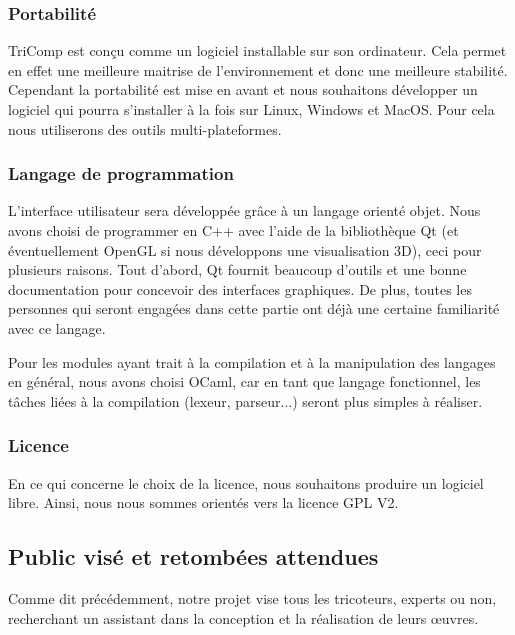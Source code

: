 \documentclass{article}
\begin{document}
\subsubsection{Portabilité}

TriComp est conçu comme un logiciel installable sur son ordinateur. Cela permet en effet une meilleure maitrise de l'environnement et donc 
une meilleure stabilité. Cependant la portabilité est mise en avant et nous souhaitons développer un logiciel qui pourra s'installer à la 
fois sur Linux, Windows et MacOS. Pour cela nous utiliserons des outils multi-plateformes. 

\subsubsection{Langage de programmation}

L'interface utilisateur sera développée grâce à un langage orienté objet. Nous avons choisi de programmer en C++ avec l'aide de la 
bibliothèque Qt (et éventuellement OpenGL si nous développons une visualisation 3D), ceci pour plusieurs raisons. Tout d'abord, Qt fournit 
beaucoup d'outils et une bonne documentation pour concevoir des interfaces graphiques. De plus, toutes les personnes qui seront engagées 
dans cette partie ont déjà une certaine familiarité avec ce langage. 

Pour les modules ayant trait à la compilation et à la manipulation des langages en général, nous avons choisi OCaml, car en 
tant que langage fonctionnel, les tâches liées à la compilation (lexeur, parseur...) seront plus simples à réaliser. 


\subsubsection{Licence}

En ce qui concerne le choix de la licence, nous souhaitons produire un logiciel libre. Ainsi, nous nous sommes orientés vers la licence 
GPL V2. %

\subsection{Public visé et retombées attendues}

Comme dit précédemment, notre projet vise tous les tricoteurs, experts ou non, recherchant un assistant dans la conception et la
réalisation de leurs \oe{}uvres.
\end{document}
